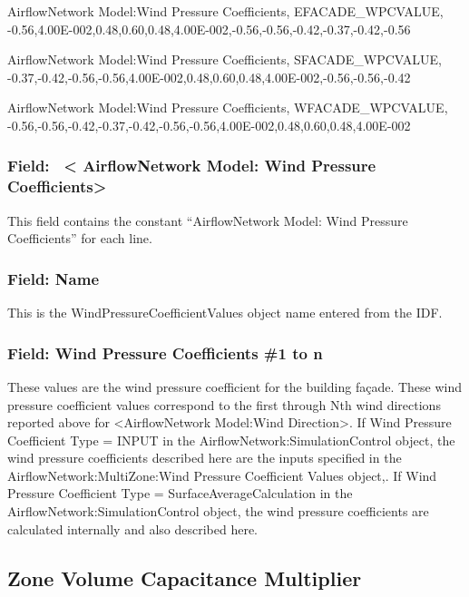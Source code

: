 AirflowNetwork Model:Wind Pressure Coefficients, EFACADE\_WPCVALUE, -0.56,4.00E-002,0.48,0.60,0.48,4.00E-002,-0.56,-0.56,-0.42,-0.37,-0.42,-0.56

AirflowNetwork Model:Wind Pressure Coefficients, SFACADE\_WPCVALUE, -0.37,-0.42,-0.56,-0.56,4.00E-002,0.48,0.60,0.48,4.00E-002,-0.56,-0.56,-0.42

AirflowNetwork Model:Wind Pressure Coefficients, WFACADE\_WPCVALUE, -0.56,-0.56,-0.42,-0.37,-0.42,-0.56,-0.56,4.00E-002,0.48,0.60,0.48,4.00E-002

\subsubsection{Field:~ \textless{} AirflowNetwork Model: Wind Pressure Coefficients\textgreater{}}\label{field-airflownetwork-model-wind-pressure-coefficients}

This field contains the constant ``AirflowNetwork Model: Wind Pressure Coefficients'' for each line.

\subsubsection{Field: Name}\label{field-name}

This is the WindPressureCoefficientValues object name entered from the IDF.

\subsubsection{Field: Wind Pressure Coefficients \#1 to n}\label{field-wind-pressure-coefficients-1-to-n}

These values are the wind pressure coefficient for the building façade. These wind pressure coefficient values correspond to the first through Nth wind directions reported above for \textless{}AirflowNetwork Model:Wind Direction\textgreater{}. If Wind Pressure Coefficient Type = INPUT in the AirflowNetwork:SimulationControl object, the wind pressure coefficients described here are the inputs specified in the AirflowNetwork:MultiZone:Wind Pressure Coefficient Values object,. If Wind Pressure Coefficient Type = SurfaceAverageCalculation in the AirflowNetwork:SimulationControl object, the wind pressure coefficients are calculated internally and also described here.

\subsection{Zone Volume Capacitance Multiplier}\label{zone-volume-capacitance-multiplier}

